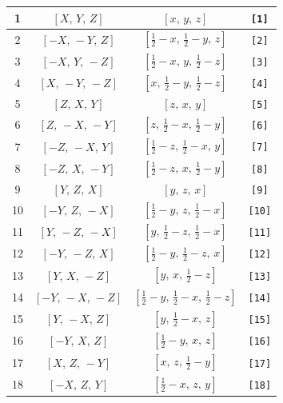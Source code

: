 \documentclass[fleqn,8pt]{jsarticle}
\begin{document}
\begin{longtable}{cccc}
1 & $\left[ X,\, Y,\, Z \right]$ & $\left[ x,\, y,\, z \right]$ & {\tt [1]} \\ \hline
2 & $\left[ - X,\, - Y,\, Z \right]$ & $\left[ \frac{1}{2} - x,\, \frac{1}{2} - y,\, z \right]$ & {\tt [2]} \\ \hline
3 & $\left[ - X,\, Y,\, - Z \right]$ & $\left[ \frac{1}{2} - x,\, y,\, \frac{1}{2} - z \right]$ & {\tt [3]} \\ \hline
4 & $\left[ X,\, - Y,\, - Z \right]$ & $\left[ x,\, \frac{1}{2} - y,\, \frac{1}{2} - z \right]$ & {\tt [4]} \\ \hline
5 & $\left[ Z,\, X,\, Y \right]$ & $\left[ z,\, x,\, y \right]$ & {\tt [5]} \\ \hline
6 & $\left[ Z,\, - X,\, - Y \right]$ & $\left[ z,\, \frac{1}{2} - x,\, \frac{1}{2} - y \right]$ & {\tt [6]} \\ \hline
7 & $\left[ - Z,\, - X,\, Y \right]$ & $\left[ \frac{1}{2} - z,\, \frac{1}{2} - x,\, y \right]$ & {\tt [7]} \\ \hline
8 & $\left[ - Z,\, X,\, - Y \right]$ & $\left[ \frac{1}{2} - z,\, x,\, \frac{1}{2} - y \right]$ & {\tt [8]} \\ \hline
9 & $\left[ Y,\, Z,\, X \right]$ & $\left[ y,\, z,\, x \right]$ & {\tt [9]} \\ \hline
10 & $\left[ - Y,\, Z,\, - X \right]$ & $\left[ \frac{1}{2} - y,\, z,\, \frac{1}{2} - x \right]$ & {\tt [10]} \\ \hline
11 & $\left[ Y,\, - Z,\, - X \right]$ & $\left[ y,\, \frac{1}{2} - z,\, \frac{1}{2} - x \right]$ & {\tt [11]} \\ \hline
12 & $\left[ - Y,\, - Z,\, X \right]$ & $\left[ \frac{1}{2} - y,\, \frac{1}{2} - z,\, x \right]$ & {\tt [12]} \\ \hline
13 & $\left[ Y,\, X,\, - Z \right]$ & $\left[ y,\, x,\, \frac{1}{2} - z \right]$ & {\tt [13]} \\ \hline
14 & $\left[ - Y,\, - X,\, - Z \right]$ & $\left[ \frac{1}{2} - y,\, \frac{1}{2} - x,\, \frac{1}{2} - z \right]$ & {\tt [14]} \\ \hline
15 & $\left[ Y,\, - X,\, Z \right]$ & $\left[ y,\, \frac{1}{2} - x,\, z \right]$ & {\tt [15]} \\ \hline
16 & $\left[ - Y,\, X,\, Z \right]$ & $\left[ \frac{1}{2} - y,\, x,\, z \right]$ & {\tt [16]} \\ \hline
17 & $\left[ X,\, Z,\, - Y \right]$ & $\left[ x,\, z,\, \frac{1}{2} - y \right]$ & {\tt [17]} \\ \hline
18 & $\left[ - X,\, Z,\, Y \right]$ & $\left[ \frac{1}{2} - x,\, z,\, y \right]$ & {\tt [18]} \\ \hline

\end{longtable}
\end{document}
